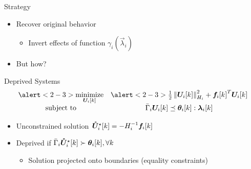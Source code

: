 \documentclass[aspectratio=169]{beamer}
\begin{document}
\begin{frame}{Strategy}
  \begin{itemize}
    \item Recover original behavior
          \begin{itemize}
            \item Invert effects of function $\gamma_{i}(\vec{\lambda}_{i})$ 
          \end{itemize}
    \item<3-> But how? 
  \end{itemize}
\end{frame}

\begin{frame}{Deprived Systems}
  \centering
  \begin{equation*}
    \begin{matrix}
      \alert<2-3>{\minimize\limits_{\vec{U}_{i}[k]}}&\alert<2-3>{\frac{1}{2}\norm{\vec{U}_{i}[k]}^{2}_{H_{i}} + {\vec{f}_{i}[k]}^{T}\vec{U}_{i}[k]}\\
      \mathrm{subject~ to} & \bar{\Gamma}_{i}\vec{U}_{i}[k] \preceq \thetaik:\lambdaik
    \end{matrix}
  \end{equation*}
  \begin{itemize}
    \item<3-> Unconstrained solution $\optuncUik=-H_{i}^{-1}\vec{f}_{i}[k]$
    \item<4-> Deprived if $\bar{\Gamma}_{i}\optuncUik\succ \thetaik, \forall k$
  \begin{itemize}
    \item<5-> Solution projected onto boundaries (equality constraints)
  \end{itemize}
  \end{itemize}
  \begin{figure}[h]
    \centering
  \end{figure}
\end{frame}
\end{document}
